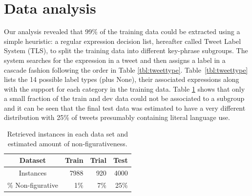 \documentclass[11pt,letterpaper]{article}
\begin{document}

\section{Data analysis}\label{sec:data}
\label{sec::dataanalysis}

Our analysis revealed that 99\% of the training data could be  extracted using a simple heuristic:  a regular expression decision list, hereafter called Tweet Label System (TLS),  to split the training data into different key-phrase subgroups. The system searches for the expression in a tweet and then assigns a label in a cascade fashion following the order in Table \ref{tbl:tweettype}. %
Table~\ref{tbl:tweettype} lists the 14 possible label types (plus {\sc None}), their associated expressions along with the support for each category in the training data. Table \ref{tbl:dataamount} shows that only a small fraction of the train and dev data could not be associated to a subgroup and it can be seen that the final test data was estimated to have a very different distribution with 25\% of tweets presumably containing literal language use.

\begin{table}[ht!]
\begin{center}
\begin{tabular}{|c|r|r|r|}
\hline
Dataset&Train&Trial&Test\\
\hline
Instances&7988&920&4000\\
\% Non-figurative&1\%&7\%&25\%\\
\hline
\end{tabular}
\end{center}
\caption{Retrieved instances in each data set and estimated amount of non-figurativeness.}
\label{tbl:dataamount}
\end{table}
\end{document}
